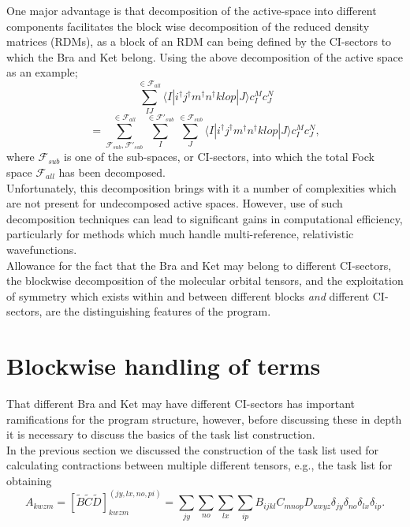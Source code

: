 \noindent One major advantage is that decomposition of the active-space
into different components facilitates the block wise decomposition of the reduced density matrices (RDMs),
as a block of an RDM can being defined by the CI-sectors to 
which the Bra and Ket belong. Using the above decomposition of the 
active space as an example;
\begin{equation*}
\sum_{IJ}^{ \in \mathcal{F}_{all} }
\langle I | i^{\dagger}j^{\dagger}m^{\dagger}n^{\dagger}klop | J \rangle c^{M}_{I} c_{J}^{N}
\end{equation*}
\begin{equation*}
=\sum^{ \in \mathcal{F}_{all} }_{ \mathcal{F}_{sub},\mathcal{F'}_{sub} }
\sum^{ \in \mathcal{F'}_{sub}}_{I}
\sum^{ \in \mathcal{F}_{sub}}_{J}
 \langle I | i^{\dagger}j^{\dagger}m^{\dagger}n^{\dagger}klop | J \rangle c^{M}_{I} c_{J}^{N},
\end{equation*}
\noindent where $\mathcal{F}_{sub}$ is one of the sub-spaces, or CI-sectors,
into which the total Fock space $\mathcal{F}_{all}$ has been decomposed.\\

\noindent Unfortunately, this decomposition brings with it a number of
complexities which are not present for undecomposed active spaces. However, 
use of such decomposition techniques can lead to significant gains 
in computational efficiency, particularly for methods which much handle
multi-reference, relativistic wavefunctions.\\ 

\noindent Allowance for the fact that the Bra and Ket may belong to different CI-sectors,
the blockwise decomposition of the molecular orbital tensors, and the exploitation 
of symmetry which exists within and between different blocks \emph{and}  different CI-sectors,
are the distinguishing features of the program.

\section{Blockwise handling of terms } 
\noindent That different Bra and Ket may have different CI-sectors has
important ramifications for the program structure, however, before discussing
these in depth it is necessary to discuss the basics of the task list
construction.\\

\noindent In the previous section we discussed the construction of the task list 
used for calculating contractions between multiple different tensors, e.g., the 
task list for obtaining
\begin{equation}
A_{kwzm} = 
[\tilde{B}\tilde{C}\tilde{D}]^{(jy,lx,no,pi)}_{kwzm} = \sum_{jy}\sum_{no}\sum_{lx}\sum_{ip} B_{ijkl}C_{mnop}D_{wxyz} \delta_{jy} \delta_{no} \delta_{lx}\delta_{ip}.
\end{equation}

